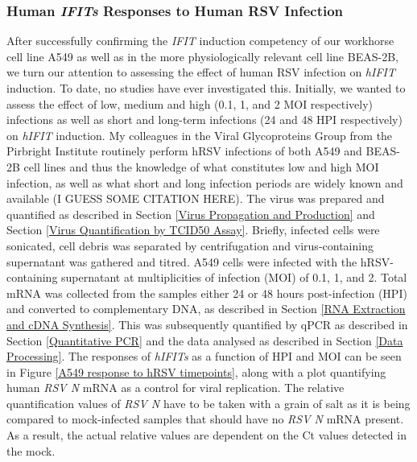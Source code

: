 \subsubsection{Human \textit{IFITs} Responses to Human RSV Infection} \label{Human \textit{IFITs} Responses to Human RSV}
After successfully confirming the \textit{IFIT} induction competency of our workhorse cell line A549 as well as in the more physiologically relevant cell line BEAS-2B, we turn our attention to assessing the effect of human RSV infection on \textit{hIFIT} induction. To date, no studies have ever investigated this. Initially, we wanted to assess the effect of low, medium and high (0.1, 1, and 2 MOI respectively) infections as well as short and long-term infections (24 and 48 HPI respectively) on \textit{hIFIT} induction. My colleagues in the Viral Glycoproteins Group from the Pirbright Institute routinely perform hRSV infections of both A549 and BEAS-2B cell lines and thus the knowledge of what constitutes low and high MOI infection, as well as what short and long infection periods are widely known and available (I GUESS SOME CITATION HERE).  The virus was prepared and quantified as described in Section \ref{Virus Propagation and Production} and Section \ref{Virus Quantification by TCID50 Assay}. Briefly, infected cells were sonicated, cell debris was separated by centrifugation and virus-containing supernatant was gathered and titred. A549 cells were infected with the hRSV-containing supernatant at multiplicities of infection (MOI) of 0.1, 1,  and 2. Total mRNA was collected from the samples either 24 or 48 hours post-infection (HPI) and converted to complementary DNA, as described in Section \ref{RNA Extraction and cDNA Synthesis}. This was subsequently quantified by qPCR as described in Section \ref{Quantitative PCR} and the data analysed as described in Section \ref{Data Processing}. The responses of \textit{hIFITs} as a function of HPI and MOI can be seen in Figure \ref{A549 response to hRSV timepoints}, along with a plot quantifying human \textit{RSV N} mRNA as a control for viral replication. The relative quantification values of \textit{RSV N} have to be taken with a grain of salt as it is being compared to mock-infected samples that should have no \textit{RSV N} mRNA present. As a result, the actual relative values are dependent on the Ct values detected in the mock. 
 

